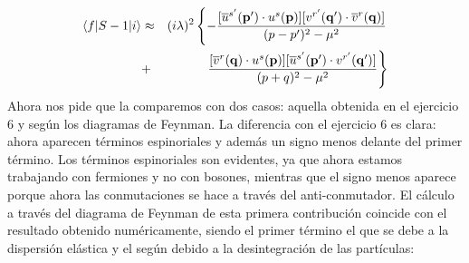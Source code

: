 \begin{solucion}
	\begin{eqnarray*}
		\mel**{f}{S-1}{i}  & \approx & (i\lambda)^2 \left\{ -\frac{[\overline{u}^{s'}(\mathbf{p}') \cdot u^{s}(\mathbf{p})]  [v^{r'}(\mathbf{q}') \cdot \overline{v}^{r}(\mathbf{q})]}{(p-p')^2 - \mu^2} \right. \\ & + &  \left. \frac{[\overline{v}^{r}(\mathbf{q}) \cdot u^{s}(\mathbf{p})] [\overline{u}^{s'}(\mathbf{p}') \cdot v^{r'}(\mathbf{q}')]}{(p+q)^2 - \mu^2} \right\}
	\end{eqnarray*}	
	Ahora nos pide que la comparemos con dos casos: aquella obtenida en el ejercicio 6 y según los diagramas de Feynman. La diferencia con el ejercicio 6 es clara: ahora aparecen términos espinoriales y además un signo menos delante del primer término. Los términos espinoriales son evidentes, ya que ahora estamos trabajando con fermiones y no con bosones, mientras que el signo menos aparece porque ahora las conmutaciones se hace a través del anti-conmutador. El cálculo a través del diagrama de Feynman de esta primera contribución coincide con el resultado obtenido numéricamente, siendo el primer término el que se debe a la dispersión elástica y el según debido a la desintegración de las partículas:
	
	\begin{center}
	\end{center}
	\begin{center}
	\end{center}
	
	
\end{solucion}



